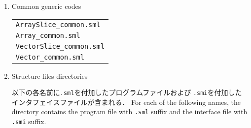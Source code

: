 \documentclass{jbook}
\newcommand{\txt}[2]{#2}
\newcommand{\code}[1]{\mbox{\large\tt #1}}
\begin{document}
\begin{enumerate}
\item \txt{共通コード}{Common generic codes}

\begin{tabular}{l}
\code{ArraySlice\_common.sml}\\
\code{Array\_common.sml}\\
\code{VectorSlice\_common.sml}\\
\code{Vector\_common.sml}
\end{tabular}

\item \txt{ストラクチャファイルディレクトリ}{Structure files directories}

\ifjp%
	以下の各名前に\code{.sml}を付加したプログラムファイルおよび
\code{.smi}を付加したインタフェイスファイルが含まれる．
\else%
	For each of the following names, the directory contains the
program file with \code{.sml} suffix and the interface file with
\code{.smi} suffix.
\fi%



\end{enumerate}
\end{document}
